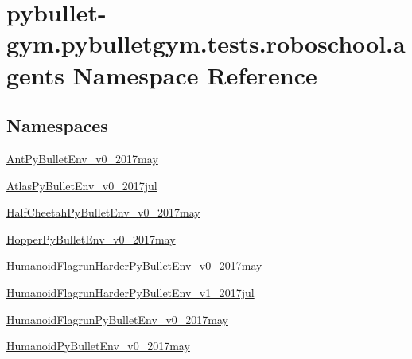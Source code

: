 \hypertarget{namespacepybullet-gym_1_1pybulletgym_1_1tests_1_1roboschool_1_1agents}{}\section{pybullet-\/gym.pybulletgym.\+tests.\+roboschool.\+agents Namespace Reference}
\label{namespacepybullet-gym_1_1pybulletgym_1_1tests_1_1roboschool_1_1agents}
\subsection*{Namespaces}
\begin{DoxyCompactItemize}
\item 
 \hyperlink{namespacepybullet-gym_1_1pybulletgym_1_1tests_1_1roboschool_1_1agents_1_1_ant_py_bullet_env__v0__2017may}{Ant\+Py\+Bullet\+Env\+\_\+v0\+\_\+2017may}
\item 
 \hyperlink{namespacepybullet-gym_1_1pybulletgym_1_1tests_1_1roboschool_1_1agents_1_1_atlas_py_bullet_env__v0__2017jul}{Atlas\+Py\+Bullet\+Env\+\_\+v0\+\_\+2017jul}
\item 
 \hyperlink{namespacepybullet-gym_1_1pybulletgym_1_1tests_1_1roboschool_1_1agents_1_1_half_cheetah_py_bullet_env__v0__2017may}{Half\+Cheetah\+Py\+Bullet\+Env\+\_\+v0\+\_\+2017may}
\item 
 \hyperlink{namespacepybullet-gym_1_1pybulletgym_1_1tests_1_1roboschool_1_1agents_1_1_hopper_py_bullet_env__v0__2017may}{Hopper\+Py\+Bullet\+Env\+\_\+v0\+\_\+2017may}
\item 
 \hyperlink{namespacepybullet-gym_1_1pybulletgym_1_1tests_1_1roboschool_1_1agents_1_1_humanoid_flagrun_harder_py_bullet_env__v0__2017may}{Humanoid\+Flagrun\+Harder\+Py\+Bullet\+Env\+\_\+v0\+\_\+2017may}
\item 
 \hyperlink{namespacepybullet-gym_1_1pybulletgym_1_1tests_1_1roboschool_1_1agents_1_1_humanoid_flagrun_harder_py_bullet_env__v1__2017jul}{Humanoid\+Flagrun\+Harder\+Py\+Bullet\+Env\+\_\+v1\+\_\+2017jul}
\item 
 \hyperlink{namespacepybullet-gym_1_1pybulletgym_1_1tests_1_1roboschool_1_1agents_1_1_humanoid_flagrun_py_bullet_env__v0__2017may}{Humanoid\+Flagrun\+Py\+Bullet\+Env\+\_\+v0\+\_\+2017may}
\item 
 \hyperlink{namespacepybullet-gym_1_1pybulletgym_1_1tests_1_1roboschool_1_1agents_1_1_humanoid_py_bullet_env__v0__2017may}{Humanoid\+Py\+Bullet\+Env\+\_\+v0\+\_\+2017may}

\end{DoxyCompactItemize}
